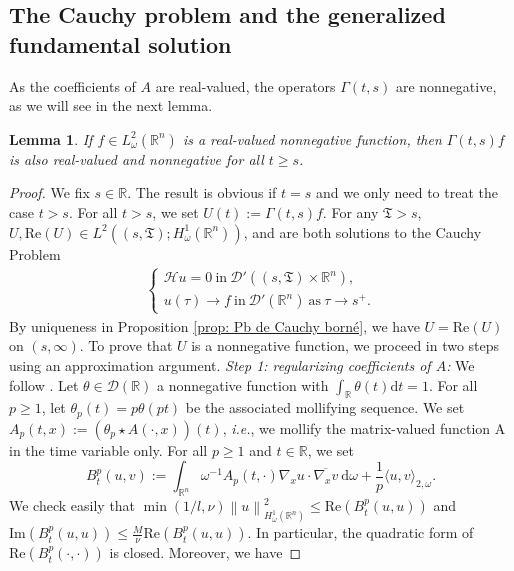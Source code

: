 \documentclass[12pt, letterpaper]{amsart}
\newtheorem{lem}[thm]{Lemma}
\theoremstyle{definition}
\theoremstyle{remark}
\numberwithin{equation}{section}
\begin{document}
\subsection{The Cauchy problem and the generalized fundamental solution}
As the coefficients of $A$ are real-valued, the operators $\Gamma(t,s)$ are nonnegative, as we will see in the next lemma. 
\begin{lem}\label{Gamma est un opérateur positif}
    If $f \in L^2_\omega(\mathbb{R}^n)$ is a real-valued nonnegative function, then $\Gamma(t,s)f$ is also real-valued and nonnegative for all $t \geq s$.
\end{lem}
\begin{proof}
We fix $s \in \mathbb{R}$. The result is obvious if $t=s$ and we only need to treat the case $t>s$. For all $t>s$, we set $U(t):=\Gamma(t,s)f$. For any $\mathfrak{T}>s$, $U,\mathrm{Re}(U) \in L^2((s,\mathfrak{T});H^1_\omega(\mathbb{R}^n))$,
and are both solutions to the Cauchy Problem
\begin{align*}
\left\{
    \begin{array}{ll}
        \mathcal{H}u=0 \ \mathrm{in} \  \mathcal{D}'((s,\mathfrak{T})\times \mathbb{R}^n), \\
        u(\tau) \rightarrow f \  \mathrm{ in } \ \mathcal{D'}(\mathbb{R}^n) \ \mathrm{as} \ \tau \rightarrow s^+.
    \end{array}
\right.
\end{align*} 
By uniqueness in Proposition \ref{prop: Pb de Cauchy borné}, we have $U=\mathrm{Re}(U)$ on $(s,\infty)$. To prove that $U$ is a nonnegative function, we proceed in two steps using an approximation argument.
\newline
\textit{Step 1: regularizing coefficients of $A$:} We follow \cite{ataei2024fundamental}. Let $\theta \in \mathcal{D}(\mathbb{R})$ a nonnegative function with $\int_\mathbb{R} \theta(t)\mathrm{d}t=1$. For all $p\ge1$, let $\theta_p(t)=p \theta(pt)$ be the associated mollifying sequence. We set $A_p(t,x):=(\theta_p \star A(\cdot,x))(t)$, \textit{i.e.}, we mollify the matrix-valued function A in the time variable only. For all $p \geq 1$ and $t \in \mathbb{R}$, we set 
$$B_t^p (u,v):= \int_{\mathbb{R}^n} \omega^{-1}A_p(t,\cdot)\nabla_x u \cdot \overline{ \nabla_x v} \ \mathrm{d}\omega + \frac{1}{p}\langle u, v \rangle_{2,\omega}.$$
We check easily that $\min(1/l, \nu )\left\| u \right\|_{H_\omega^1(\mathbb{R}^n)}^2 \leq \mathrm{Re}(B_t^p(u,u))$ and $\mathrm{Im}(B_t^p(u,u)) \leq \frac{M}{\nu}\mathrm{Re}(B_t^p(u,u))$. In particular, the quadratic form of $\mathrm{Re}(B_t^p(\cdot,\cdot))$ is closed. Moreover, we have 

\end{proof}
\end{document}
